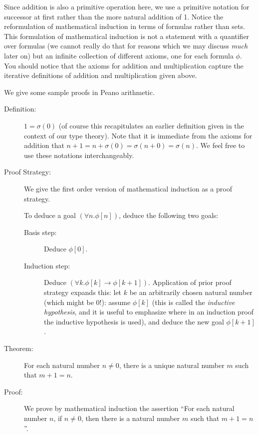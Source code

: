 \documentclass[12pt]{book}
\begin{document}
Since addition is also a primitive operation here, we use a primitive
notation for successor at first rather than the more natural addition
of 1.  Notice the reformulation of mathematical induction in terms of
formulas rather than sets.  This formulation of mathematical induction
is not a statement with a quantifier over formulas (we cannot really
do that for reasons which we may discuss {\em much\/} later on) but an
infinite collection of different axioms, one for each formula $\phi$.
You should notice that the axioms for addition and multiplication
capture the iterative definitions of addition and multiplication given
above.

We give some sample proofs in Peano arithmetic.

\begin{description}

\item[Definition:] $1 = \sigma(0)$ (of course this recapitulates an earlier definition given in the context of our type theory).  Note that it is immediate from
the axioms for addition that $n+1 = n+\sigma(0) = \sigma(n+0) =
\sigma(n)$.  We feel free to use these notations interchangeably.

\item[Proof Strategy:] We give the first order version of mathematical
induction as a proof strategy.

To deduce a goal $(\forall n.\phi[n])$, deduce the following two goals:

\begin{description}

\item[Basis step:]  Deduce $\phi[0]$.

\item[Induction step:] Deduce $(\forall k.\phi[k] \rightarrow
\phi[k+1])$.  Application of prior proof strategy expands this: let
$k$ be an arbitrarily chosen natural number (which might be 0!):
assume $\phi[k]$ (this is called the {\em inductive hypothesis\/}, and
it is useful to emphasize where in an induction proof the inductive
hypothesis is used), and deduce the new goal $\phi[k+1]$.

\end{description}

\item[Theorem:] For each natural number $n \neq 0$, there is a unique
natural number $m$ such that $m+1=n$.

\item[Proof:] We prove by mathematical induction the assertion ``For
each natural number $n$, if $n \neq 0$, then there is a natural number
$m$ such that $m+1=n$''.


\end{description}
\end{document}
